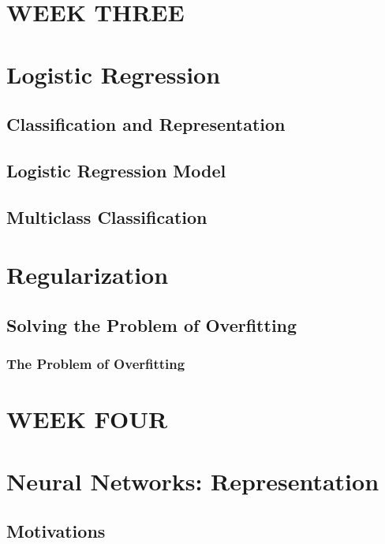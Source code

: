 \documentclass[11pt,a4paper]{article}
\begin{document}
\newpage
\section*{WEEK   THREE}

\section{Logistic Regression}
    \subsection{Classification and Representation}
    \subsection{Logistic Regression Model}
    \subsection{Multiclass Classification}




\section{Regularization}
    \subsection{Solving the Problem of Overfitting}
    \subsubsection{The Problem of Overfitting}



\newpage
\section*{WEEK   FOUR}

\section{Neural Networks: Representation}
    \subsection{Motivations}
\end{document}
